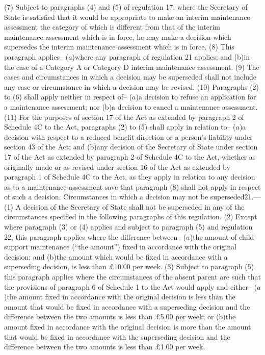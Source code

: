 \documentclass[12pt,a4paper]{article}
\begin{document}
(7) Subject to paragraphs (4) and (5) of regulation 17, where the Secretary of State is satisfied that it would be appropriate to make an interim maintenance assessment the category of which is different from that of the interim maintenance assessment which is in force, he may make a decision which supersedes the interim maintenance assessment which is in force.
(8) This paragraph applies–
($a$)where any paragraph of regulation 21 applies; and
(b)in the case of a Category A or Category D interim maintenance assessment.
(9) The cases and circumstances in which a decision may be superseded shall not include any case or circumstance in which a decision may be revised.
(10) Paragraphs (2) to (6) shall apply neither in respect of–
($a$)a decision to refuse an application for a maintenance assessment; nor
(b)a decision to cancel a maintenance assessment.
(11) For the purposes of section 17 of the Act as extended by paragraph 2 of Schedule 4C to the Act, paragraphs (2) to (5) shall apply in relation to–
($a$)a decision with respect to a reduced benefit direction or a person’s liability under section 43 of the Act; and
(b)any decision of the Secretary of State under section 17 of the Act as extended by paragraph 2 of Schedule 4C to the Act, whether as originally made or as revised under section 16 of the Act as extended by paragraph 1 of Schedule 4C to the Act, as they apply in relation to any decision as to a maintenance assessment save that paragraph (8) shall not apply in respect of such a decision.
Circumstances in which a decision may not be superseded21.—(1) A decision of the Secretary of State shall not be superseded in any of the circumstances specified in the following paragraphs of this regulation.
(2) Except where paragraph (3) or (4) applies and subject to paragraph (5) and regulation 22, this paragraph applies where the difference between–
($a$)the amount of child support maintenance (“the amount”) fixed in accordance with the original decision; and
(b)the amount which would be fixed in accordance with a superseding decision,
is less than £10.00 per week.
(3) Subject to paragraph (5), this paragraph applies where the circumstances of the absent parent are such that the provisions of paragraph 6 of Schedule 1 to the Act would apply and either–
($a$)the amount fixed in accordance with the original decision is less than the amount that would be fixed in accordance with a superseding decision and the difference between the two amounts is less than £5.00 per week; or
(b)the amount fixed in accordance with the original decision is more than the amount that would be fixed in accordance with the superseding decision and the difference between the two amounts is less than £1.00 per week.
\end{document}
